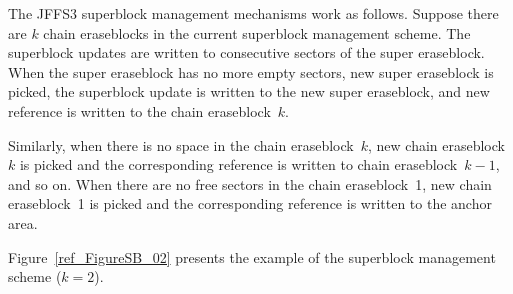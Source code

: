 The JFFS3 superblock management mechanisms work as follows. Suppose there are
$k$ chain eraseblocks in the current superblock management scheme. The superblock
updates are written to consecutive sectors of the super eraseblock. When
the super eraseblock has no more empty sectors, new super eraseblock is picked,
the superblock update is written to the new super eraseblock, and new reference
is written to the chain eraseblock~$k$.

Similarly, when there is no space in the chain eraseblock~$k$, new chain
eraseblock~$k$ is picked and the corresponding reference is written to chain
eraseblock~$k-1$, and so on. When there are no free sectors in the chain
eraseblock~1, new chain eraseblock~1 is picked and the corresponding
reference is written to the anchor area.

Figure~\ref{ref_FigureSB_02} presents the example of the superblock management
scheme ($k = 2$).

